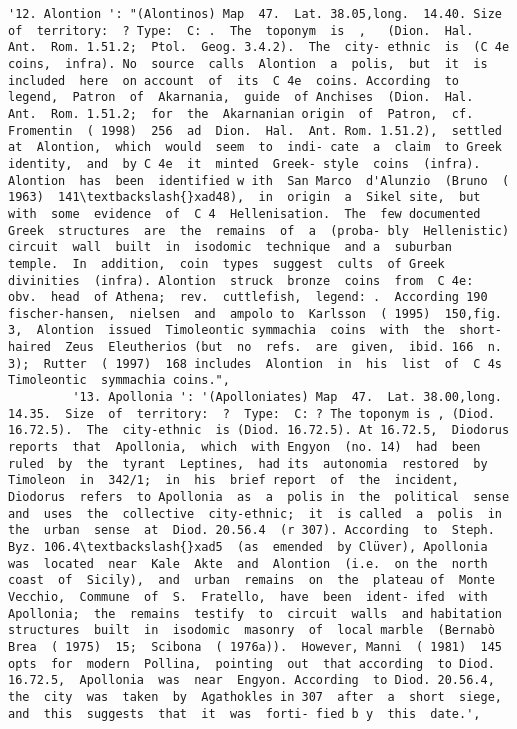\documentclass[11pt]{article}
\begin{document}
\begin{Verbatim}[commandchars=\\\{\}]
         '12. Alontion ': "(Alontinos) Map  47.  Lat. 38.05,long.  14.40. Size of  territory:  ? Type:  C: .  The  toponym  is  ,   (Dion.  Hal.  Ant.  Rom. 1.51.2;  Ptol.  Geog. 3.4.2).  The  city- ethnic  is  (C 4e  coins,  infra). No  source  calls  Alontion  a  polis,  but  it  is  included  here  on account  of  its  C 4e  coins. According  to legend,  Patron  of  Akarnania,  guide  of Anchises  (Dion.  Hal.  Ant.  Rom. 1.51.2;  for  the  Akarnanian origin  of  Patron,  cf.  Fromentin  ( 1998)  256  ad  Dion.  Hal.  Ant. Rom. 1.51.2),  settled  at  Alontion,  which  would  seem  to  indi- cate  a  claim  to Greek  identity,  and  by C 4e  it  minted  Greek- style  coins  (infra).  Alontion  has  been  identified w ith  San Marco  d'Alunzio  (Bruno  ( 1963)  141\textbackslash{}xad48),  in  origin  a  Sikel site,  but  with  some  evidence  of  C 4  Hellenisation.  The  few documented  Greek  structures  are  the  remains  of  a  (proba- bly  Hellenistic)  circuit  wall  built  in  isodomic  technique  and a  suburban  temple.  In  addition,  coin  types  suggest  cults  of Greek  divinities  (infra). Alontion  struck  bronze  coins  from  C 4e:  obv.  head  of Athena;  rev.  cuttlefish,  legend: .  According 190 fischer-hansen,  nielsen  and  ampolo to  Karlsson  ( 1995)  150,fig.  3,  Alontion  issued  Timoleontic symmachia  coins  with  the  short-haired  Zeus  Eleutherios (but  no  refs.  are  given,  ibid. 166  n. 3);  Rutter  ( 1997)  168 includes  Alontion  in  his  list  of  C 4s  Timoleontic  symmachia coins.",
         '13. Apollonia ': '(Apolloniates) Map  47.  Lat. 38.00,long. 14.35.  Size  of  territory:  ?  Type:  C: ? The toponym is , (Diod. 16.72.5).  The  city-ethnic  is (Diod. 16.72.5). At 16.72.5,  Diodorus  reports  that  Apollonia,  which  with Engyon  (no. 14)  had  been  ruled  by  the  tyrant  Leptines,  had its  autonomia  restored  by  Timoleon  in  342/1;  in  his  brief report  of  the  incident,  Diodorus  refers  to Apollonia  as  a  polis in  the  political  sense  and  uses  the  collective  city-ethnic;  it  is called  a  polis  in  the  urban  sense  at  Diod. 20.56.4  (r 307). According  to  Steph.  Byz. 106.4\textbackslash{}xad5  (as  emended  by Clüver), Apollonia  was  located  near  Kale  Akte  and  Alontion  (i.e.  on the  north  coast  of  Sicily),  and  urban  remains  on  the  plateau of  Monte  Vecchio,  Commune  of  S.  Fratello,  have  been  ident- ifed  with  Apollonia;  the  remains  testify  to  circuit  walls  and habitation  structures  built  in  isodomic  masonry  of  local marble  (Bernabò  Brea  ( 1975)  15;  Scibona  ( 1976a)).  However, Manni  ( 1981)  145  opts  for  modern  Pollina,  pointing  out  that according  to Diod. 16.72.5,  Apollonia  was  near  Engyon. According  to Diod. 20.56.4,  the  city  was  taken  by  Agathokles in 307  after  a  short  siege,  and  this  suggests  that  it  was  forti- fied b y  this  date.',

\end{Verbatim}
\end{document}
